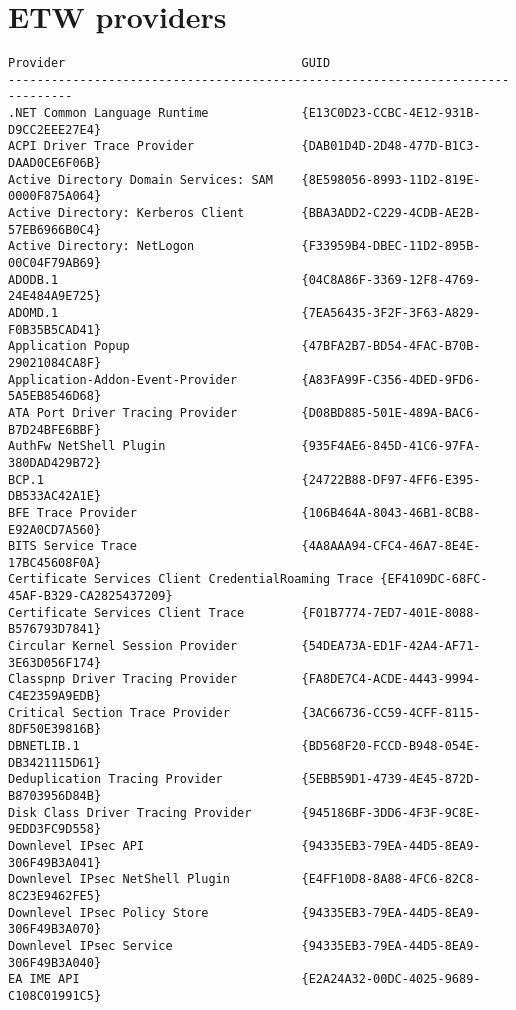 \documentclass{report}
\begin{document}
\section{ETW providers}
\label{appendix:etw-providers}
\begin{lstlisting}[breaklines=true,basicstyle=\tiny]
Provider                                 GUID
-------------------------------------------------------------------------------
.NET Common Language Runtime             {E13C0D23-CCBC-4E12-931B-D9CC2EEE27E4}
ACPI Driver Trace Provider               {DAB01D4D-2D48-477D-B1C3-DAAD0CE6F06B}
Active Directory Domain Services: SAM    {8E598056-8993-11D2-819E-0000F875A064}
Active Directory: Kerberos Client        {BBA3ADD2-C229-4CDB-AE2B-57EB6966B0C4}
Active Directory: NetLogon               {F33959B4-DBEC-11D2-895B-00C04F79AB69}
ADODB.1                                  {04C8A86F-3369-12F8-4769-24E484A9E725}
ADOMD.1                                  {7EA56435-3F2F-3F63-A829-F0B35B5CAD41}
Application Popup                        {47BFA2B7-BD54-4FAC-B70B-29021084CA8F}
Application-Addon-Event-Provider         {A83FA99F-C356-4DED-9FD6-5A5EB8546D68}
ATA Port Driver Tracing Provider         {D08BD885-501E-489A-BAC6-B7D24BFE6BBF}
AuthFw NetShell Plugin                   {935F4AE6-845D-41C6-97FA-380DAD429B72}
BCP.1                                    {24722B88-DF97-4FF6-E395-DB533AC42A1E}
BFE Trace Provider                       {106B464A-8043-46B1-8CB8-E92A0CD7A560}
BITS Service Trace                       {4A8AAA94-CFC4-46A7-8E4E-17BC45608F0A}
Certificate Services Client CredentialRoaming Trace {EF4109DC-68FC-45AF-B329-CA2825437209}
Certificate Services Client Trace        {F01B7774-7ED7-401E-8088-B576793D7841}
Circular Kernel Session Provider         {54DEA73A-ED1F-42A4-AF71-3E63D056F174}
Classpnp Driver Tracing Provider         {FA8DE7C4-ACDE-4443-9994-C4E2359A9EDB}
Critical Section Trace Provider          {3AC66736-CC59-4CFF-8115-8DF50E39816B}
DBNETLIB.1                               {BD568F20-FCCD-B948-054E-DB3421115D61}
Deduplication Tracing Provider           {5EBB59D1-4739-4E45-872D-B8703956D84B}
Disk Class Driver Tracing Provider       {945186BF-3DD6-4F3F-9C8E-9EDD3FC9D558}
Downlevel IPsec API                      {94335EB3-79EA-44D5-8EA9-306F49B3A041}
Downlevel IPsec NetShell Plugin          {E4FF10D8-8A88-4FC6-82C8-8C23E9462FE5}
Downlevel IPsec Policy Store             {94335EB3-79EA-44D5-8EA9-306F49B3A070}
Downlevel IPsec Service                  {94335EB3-79EA-44D5-8EA9-306F49B3A040}
EA IME API                               {E2A24A32-00DC-4025-9689-C108C01991C5}

\end{lstlisting}
\end{document}
